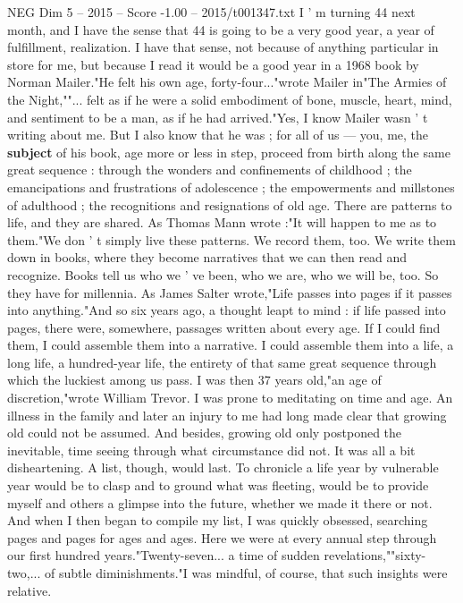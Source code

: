\begin{textsample}{NEG Dim 5 – 2015 – Score -1.00 – 2015/t001347.txt}  \label{ex:f5_neg_028}
I ' m turning 44 next month, and I have the sense that 44 is going to be a very good year, a year of fulfillment, realization.
I have that sense, not because of anything particular in store for me, but because I read it would be a good year in a 1968 book by Norman Mailer."He felt his own age, forty-four..."wrote Mailer in"The Armies of the Night,""... felt as if he were a solid embodiment of bone, muscle, heart, mind, and sentiment to be a man, as if he had arrived."Yes, I know Mailer wasn ' t writing about me.
But I also know that he was ; for all of us — you, me, the \textbf{subject} of his book, age more or less in step, proceed from birth along the same great sequence : through the wonders and confinements of childhood ; the emancipations and frustrations of adolescence ; the empowerments and millstones of adulthood ; the recognitions and resignations of old age.
There are patterns to life, and they are shared.
As Thomas Mann wrote :"It will happen to me as to them."We don ' t simply live these patterns.
We record them, too.
We write them down in books, where they become narratives that we can then read and recognize.
Books tell us who we ' ve been, who we are, who we will be, too.
So they have for millennia.
As James Salter wrote,"Life passes into pages if it passes into anything."And so six years ago, a thought leapt to mind : if life passed into pages, there were, somewhere, passages written about every age.
If I could find them, I could assemble them into a narrative.
I could assemble them into a life, a long life, a hundred-year life, the entirety of that same great sequence through which the luckiest among us pass.
I was then 37 years old,"an age of discretion,"wrote William Trevor.
I was prone to meditating on time and age.
An illness in the family and later an injury to me had long made clear that growing old could not be assumed.
And besides, growing old only postponed the inevitable, time seeing through what circumstance did not.
It was all a bit disheartening.
A list, though, would last.
To chronicle a life year by vulnerable year would be to clasp and to ground what was fleeting, would be to provide myself and others a glimpse into the future, whether we made it there or not.
And when I then began to compile my list, I was quickly obsessed, searching pages and pages for ages and ages.
Here we were at every annual step through our first hundred years."Twenty-seven... a time of sudden revelations,""sixty-two,... of subtle diminishments."I was mindful, of course, that such insights were relative.

\end{textsample}
